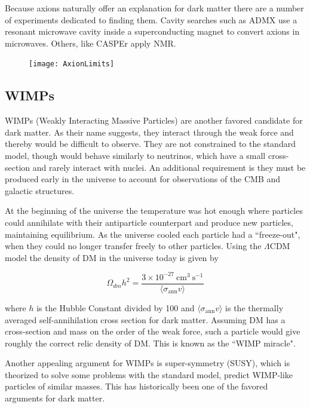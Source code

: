 Because axions naturally offer an explanation for dark matter there are a number of experiments dedicated to
finding them.  Cavity searches such as ADMX use a resonant microwave cavity inside a superconducting magnet
to convert axions in microwaves.  Others, like CASPEr apply NMR.

\begin{figure}
\centering
\texttt{[image: AxionLimits]}
\label{fig:axions}
\end{figure}


\subsection{WIMPs} \label{subsec:wimps}
WIMPs (Weakly Interacting Massive Particles) are another favored candidate for dark matter.  As their name
suggests, they interact through the weak force and thereby would be difficult to observe.  They
are not constrained to the standard model, though would behave similarly
to neutrinos, which have a small cross-section and rarely interact with nuclei.  An additional requirement
is they must be produced early in the universe to account for observations of the CMB and galactic
structures.

At the beginning of the universe the temperature was hot enough where particles could annihilate with their
antiparticle counterpart and produce new particles, maintaining equilibrium.  As the universe cooled each
particle had a ``freeze-out", when they could no longer transfer freely to other particles.  Using the
$\Lambda$CDM model the density of DM in the universe today is given by

\begin{equation}
\Omega_{dm}h^{2} = \frac{3 \times 10^{-27}\ \mathrm{cm^{3}\ s^{-1}}}{\langle \sigma_{\mathrm{ann}} v \rangle}
\end{equation}

\noindent where $h$ is the Hubble Constant divided by 100 and $\langle \sigma_{\mathrm{ann}} v \rangle$ is
the thermally averaged self-annihilation cross section
for dark matter.  Assuming DM has a cross-section and mass on the order of the weak force, such a
particle would give roughly the correct relic density of DM.  This is known as the ``WIMP miracle".

Another appealing argument for WIMPs is super-symmetry (SUSY), which is theorized to solve some problems
with the standard model,
predict WIMP-like particles of similar masses.  This has historically been one of the favored arguments
for dark matter.


